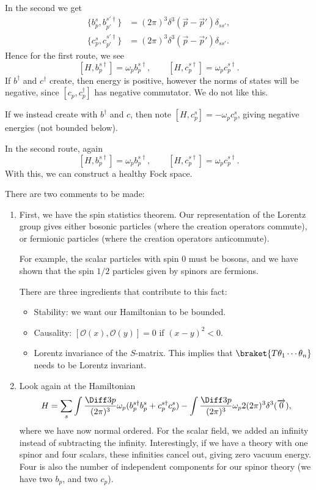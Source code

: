 \documentclass[12pt]{article}
\begin{document}
In the second we get
\begin{align*}
	\{b_p^{s}, b_{p'}^{s'\dagger}\} &= (2\pi)^3 \delta^3(\overrightarrow{p} - \overrightarrow{p}') \delta_{ss'}, \\
	\{c_p^{s}, c_{p'}^{s'\dagger}\} &= (2\pi)^3\delta^3(\overrightarrow{p} - \overrightarrow{p}') \delta_{ss'}.
\end{align*}
Hence for the first route, we see
\[
	[H, b_p^{s\dagger}] = \omega_p b_p^{s\dagger}, \qquad [H, c_p^{s\dagger}] = \omega_p c_p^{s\dagger}.
\]
If $b^{\dagger}$ and $c^{\dagger}$ create, then energy is positive, however the norms of states will be negative, since $[c_p, c_p^{\dagger}]$ has negative commutator. We do not like this.

If we instead create with $b^{\dagger}$ and $c$, then note $[H, c_p^{s}] = - \omega_p c_p^{s}$, giving negative energies (not bounded below).

In the second route, again
\[
	[H, b_p^{s\dagger}] = \omega_p b_p^{s\dagger}, \qquad [H, c_p^{s\dagger}] = \omega_p c_p^{s\dagger}.
\]
With this, we can construct a healthy Fock space.

There are two comments to be made:
\begin{enumerate}
	\item First, we have the spin statistics theorem. Our representation of the Lorentz group gives either bosonic particles (where the creation operators commute), or fermionic particles (where the creation operators anticommute).

		For example, the scalar particles with spin 0 must be bosons, and we have shown that the spin $1/2$ particles given by spinors are fermions.

		There are three ingredients that contribute to this fact:
		\begin{itemize}
			\item Stability: we want our Hamiltonian to be bounded.
			\item Causality: $[\mathcal{O}(x), \mathcal{O}(y)] = 0$ if $(x - y)^2 < 0$.
		\item Lorentz invariance of the $S$-matrix. This implies that $\braket{T \theta_1 \cdots \theta_n}$ needs to be Lorentz invariant.
		\end{itemize}
	\item Look again at the Hamiltonian
		\[
		H = \sum_s \int \frac{\Diff 3 p}{(2 \pi)^3} \omega_p (b_p^{s\dagger} b_p^{s} + c_p^{s\dagger} c_p^{s}) - \int \frac{\Diff 3 p}{(2 \pi)^3} \omega_p 2 (2 \pi)^3 \delta^3(\overrightarrow{0}),
		\]
		where we have now normal ordered. For the scalar field, we added an infinity instead of subtracting the infinity. Interestingly, if we have a theory with one spinor and four scalars, these infinities cancel out, giving zero vacuum energy. Four is also the number of independent components for our spinor theory (we have two $b_p$, and two $c_p$).
\end{enumerate}
\end{document}
